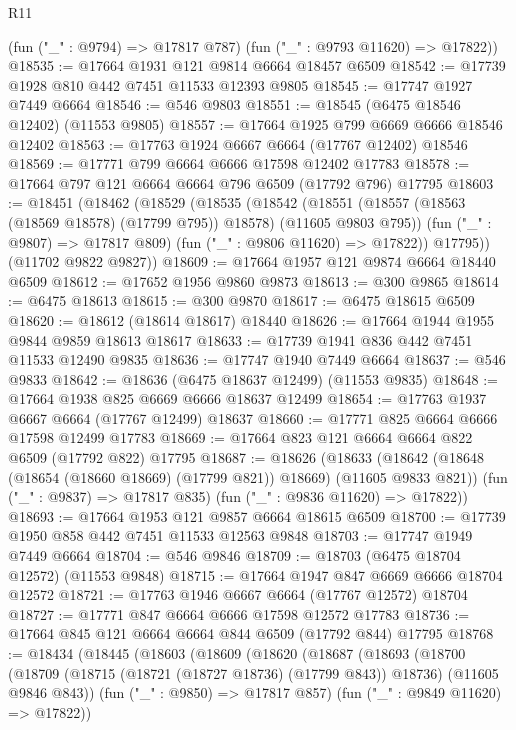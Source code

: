 \begin{lexlean}{R11}
\begin{coremodule}
{{{{{{{{{{{{{{{{{{{{{{{{{{{{{{{{{{{{{{{{{{{{{{{{{{{{{{{{{{{{{{{{{{{{{{{{{{{{{{{{{{      (fun ("_" : @9794) => @17817 @787)
      (fun ("_" : @9793 @11620) => @17822))
@18535 := @17664 @1931 @121 @9814 @6664 @18457 @6509
@18542 := @17739 @1928 @810 @442 @7451 @11533 @12393 @9805
@18545 := @17747 @1927 @7449 @6664
@18546 := @546 @9803
@18551 := @18545 (@6475 @18546 @12402) (@11553 @9805)
@18557 := @17664 @1925 @799 @6669 @6666 @18546 @12402
@18563 := @17763 @1924 @6667 @6664 (@17767 @12402) @18546
@18569 := @17771 @799 @6664 @6666 @17598 @12402 @17783
@18578 := @17664 @797 @121 @6664 @6664 @796 @6509 (@17792 @796) @17795
@18603 := @18451
    (@18462
      (@18529
        (@18535
          (@18542
            (@18551 (@18557 (@18563 (@18569 @18578) (@17799 @795)) @18578) (@11605 @9803 @795))
            (fun ("_" : @9807) => @17817 @809)
            (fun ("_" : @9806 @11620) => @17822))
          @17795))
      (@11702 @9822 @9827))
@18609 := @17664 @1957 @121 @9874 @6664 @18440 @6509
@18612 := @17652 @1956 @9860 @9873
@18613 := @300 @9865
@18614 := @6475 @18613
@18615 := @300 @9870
@18617 := @6475 @18615 @6509
@18620 := @18612 (@18614 @18617) @18440
@18626 := @17664 @1944 @1955 @9844 @9859 @18613 @18617
@18633 := @17739 @1941 @836 @442 @7451 @11533 @12490 @9835
@18636 := @17747 @1940 @7449 @6664
@18637 := @546 @9833
@18642 := @18636 (@6475 @18637 @12499) (@11553 @9835)
@18648 := @17664 @1938 @825 @6669 @6666 @18637 @12499
@18654 := @17763 @1937 @6667 @6664 (@17767 @12499) @18637
@18660 := @17771 @825 @6664 @6666 @17598 @12499 @17783
@18669 := @17664 @823 @121 @6664 @6664 @822 @6509 (@17792 @822) @17795
@18687 := @18626
    (@18633
      (@18642 (@18648 (@18654 (@18660 @18669) (@17799 @821)) @18669) (@11605 @9833 @821))
      (fun ("_" : @9837) => @17817 @835)
      (fun ("_" : @9836 @11620) => @17822))
@18693 := @17664 @1953 @121 @9857 @6664 @18615 @6509
@18700 := @17739 @1950 @858 @442 @7451 @11533 @12563 @9848
@18703 := @17747 @1949 @7449 @6664
@18704 := @546 @9846
@18709 := @18703 (@6475 @18704 @12572) (@11553 @9848)
@18715 := @17664 @1947 @847 @6669 @6666 @18704 @12572
@18721 := @17763 @1946 @6667 @6664 (@17767 @12572) @18704
@18727 := @17771 @847 @6664 @6666 @17598 @12572 @17783
@18736 := @17664 @845 @121 @6664 @6664 @844 @6509 (@17792 @844) @17795
@18768 := @18434
    (@18445
      (@18603
        (@18609
          (@18620
            (@18687
              (@18693
                (@18700
                  (@18709
                    (@18715 (@18721 (@18727 @18736) (@17799 @843)) @18736)
                    (@11605 @9846 @843))
                  (fun ("_" : @9850) => @17817 @857)
                  (fun ("_" : @9849 @11620) => @17822))
}}}}}}}}}}}}}}}}}}}}}}}}}}}}}}}}}}}}}}}}}}}}}}}}}}}}}}}}}}}}}}}}}}}}}}}}}}}}}}}}}}
\end{coremodule}
\end{lexlean}
